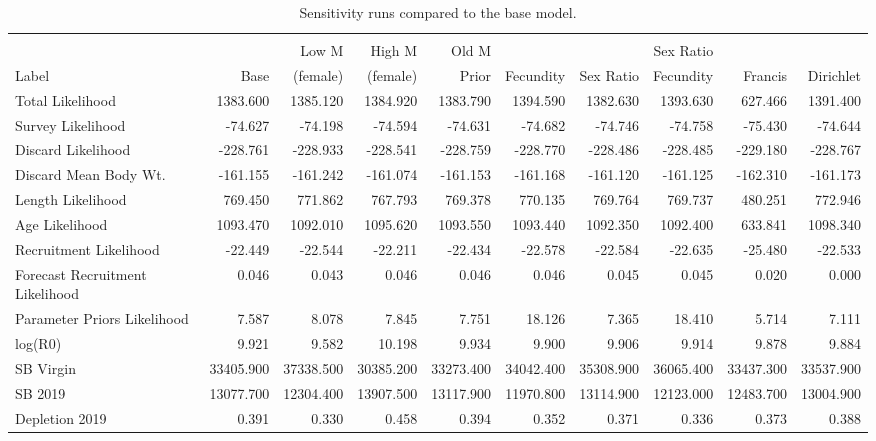 \documentclass[12pt,]{article}
\begin{document}
\begin{landscape}
\begingroup\fontsize{9pt}{10pt}\selectfont
\begin{longtable}{lrrrrrrrrr}
\caption{Sensitivity runs compared to the base model.} \\ 
  \hline
 &  &  &  &  &  &  &  &  &  \\ 
        &      & Low M    & High M   &  Old M  &           &            & Sex Ratio &          &          \\
 Label & Base & (female) & (female) &  Prior  & Fecundity &  Sex Ratio & Fecundity & Francis & Dirichlet \\
 \hline
Total Likelihood & 1383.600 & 1385.120 & 1384.920 & 1383.790 & 1394.590 & 1382.630 & 1393.630 & 627.466 & 1391.400 \\ 
  Survey Likelihood & -74.627 & -74.198 & -74.594 & -74.631 & -74.682 & -74.746 & -74.758 & -75.430 & -74.644 \\ 
  Discard Likelihood & -228.761 & -228.933 & -228.541 & -228.759 & -228.770 & -228.486 & -228.485 & -229.180 & -228.767 \\ 
  Discard Mean Body Wt. & -161.155 & -161.242 & -161.074 & -161.153 & -161.168 & -161.120 & -161.125 & -162.310 & -161.173 \\ 
  Length Likelihood & 769.450 & 771.862 & 767.793 & 769.378 & 770.135 & 769.764 & 769.737 & 480.251 & 772.946 \\ 
  Age Likelihood & 1093.470 & 1092.010 & 1095.620 & 1093.550 & 1093.440 & 1092.350 & 1092.400 & 633.841 & 1098.340 \\ 
  Recruitment Likelihood & -22.449 & -22.544 & -22.211 & -22.434 & -22.578 & -22.584 & -22.635 & -25.480 & -22.533 \\ 
  Forecast Recruitment Likelihood & 0.046 & 0.043 & 0.046 & 0.046 & 0.046 & 0.045 & 0.045 & 0.020 & 0.000 \\ 
  Parameter Priors Likelihood & 7.587 & 8.078 & 7.845 & 7.751 & 18.126 & 7.365 & 18.410 & 5.714 & 7.111 \\ 
  log(R0) & 9.921 & 9.582 & 10.198 & 9.934 & 9.900 & 9.906 & 9.914 & 9.878 & 9.884 \\ 
  SB Virgin & 33405.900 & 37338.500 & 30385.200 & 33273.400 & 34042.400 & 35308.900 & 36065.400 & 33437.300 & 33537.900 \\ 
  SB 2019 & 13077.700 & 12304.400 & 13907.500 & 13117.900 & 11970.800 & 13114.900 & 12123.000 & 12483.700 & 13004.900 \\ 
  Depletion 2019 & 0.391 & 0.330 & 0.458 & 0.394 & 0.352 & 0.371 & 0.336 & 0.373 & 0.388 \\ 

\end{longtable}
\end{landscape}
\end{document}
